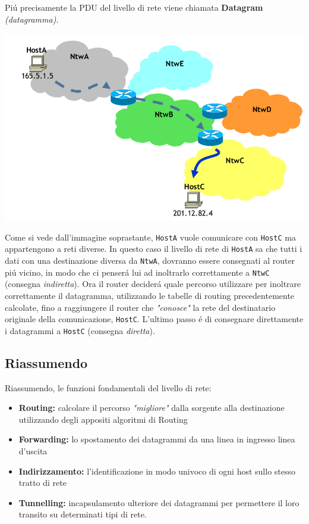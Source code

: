 \documentclass[12pt]{article}
\def\code#1{\texttt{#1}}
\begin{document}
Pi\'u precisamente la PDU del livello di rete viene chiamata \textbf{Datagram} \textit{(datagramma)}.
\begin{center}
	\includegraphics[scale=0.35]{livello_di_rete-img1.png}
\end{center}
Come si vede dall'immagine soprastante, \code{HostA} vuole comunicare con \code{HostC} ma appartengono a reti diverse. 
In questo caso il livello di rete di \code{HostA} sa che tutti i dati con una destinazione diversa da \code{NtwA}, 
dovranno essere consegnati al router pi\'u vicino, in modo che ci penser\'a lui ad inoltrarlo correttamente a 
\code{NtwC} (consegna \textit{indiretta}). Ora il router decider\'a quale percorso utilizzare per inoltrare 
correttamente il datagramma, utilizzando le tabelle di routing precedentemente calcolate, fino a raggiungere il router 
che \textit{"conosce"} la rete del destinatario originale della comunicazione, \code{HostC}. L'ultimo passo \'e di 
consegnare direttamente i datagrammi a \code{HostC} (consegna \textit{diretta}).

\clearpage
\subsection{Riassumendo}\label{livello-di-rete-riassumendo}
Riassumendo, le funzioni fondamentali del livello di rete:
\begin{itemize}
	\item \textbf{Routing:} calcolare il percorso \textit{"migliore"} dalla sorgente alla destinazione utilizzando degli 
	       appositi algoritmi di Routing
	\item \textbf{Forwarding:} lo spostamento dei datagrammi da una linea in ingresso linea d'uscita
	\item \textbf{Indirizzamento:} l'identificazione in modo univoco di ogni host sullo stesso tratto di rete
	\item \textbf{Tunnelling:} incapsulamento ulteriore dei datagrammi per permettere il loro transito su determinati 
	      tipi di rete.
\end{itemize}
\end{document}
